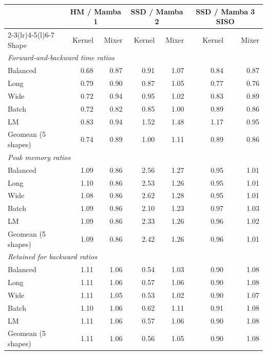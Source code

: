 \begin{tabular}{@{}lrrrrrr@{}}
\toprule
& \multicolumn{2}{c}{HM / Mamba 1} & \multicolumn{2}{c}{SSD / Mamba 2} & \multicolumn{2}{c}{SSD / Mamba 3 SISO} \\
\cmidrule(lr){2-3}\cmidrule(lr){4-5}\cmidrule(l){6-7}
Shape & Kernel & Mixer & Kernel & Mixer & Kernel & Mixer \\
\midrule
\multicolumn{7}{l}{\emph{Forward-and-backward time ratios}} \\
\addlinespace[2pt]
Balanced & 0.68 & 0.87 & 0.91 & 1.07 & 0.84 & 0.87 \\
Long & 0.79 & 0.90 & 0.87 & 1.05 & 0.77 & 0.76 \\
Wide & 0.72 & 0.94 & 0.95 & 1.02 & 0.83 & 0.89 \\
Batch & 0.72 & 0.82 & 0.85 & 1.00 & 0.89 & 0.86 \\
LM & 0.83 & 0.94 & 1.52 & 1.48 & 1.17 & 0.95 \\
\addlinespace[2pt]
Geomean (5 shapes) & 0.74 & 0.89 & 1.00 & 1.11 & 0.89 & 0.86 \\
\midrule
\multicolumn{7}{l}{\emph{Peak memory ratios}} \\
\addlinespace[2pt]
Balanced & 1.09 & 0.86 & 2.56 & 1.27 & 0.95 & 1.01 \\
Long & 1.10 & 0.86 & 2.53 & 1.26 & 0.95 & 1.01 \\
Wide & 1.08 & 0.86 & 2.62 & 1.28 & 0.95 & 1.01 \\
Batch & 1.09 & 0.86 & 2.10 & 1.23 & 0.97 & 1.03 \\
LM & 1.09 & 0.86 & 2.33 & 1.26 & 0.96 & 1.02 \\
\addlinespace[2pt]
Geomean (5 shapes) & 1.09 & 0.86 & 2.42 & 1.26 & 0.96 & 1.01 \\
\midrule
\multicolumn{7}{l}{\emph{Retained for backward ratios}} \\
\addlinespace[2pt]
Balanced & 1.11 & 1.06 & 0.54 & 1.03 & 0.90 & 1.08 \\
Long & 1.11 & 1.06 & 0.57 & 1.06 & 0.90 & 1.08 \\
Wide & 1.11 & 1.05 & 0.53 & 1.02 & 0.90 & 1.07 \\
Batch & 1.10 & 1.06 & 0.62 & 1.11 & 0.91 & 1.08 \\
LM & 1.11 & 1.06 & 0.57 & 1.06 & 0.90 & 1.08 \\
\addlinespace[2pt]
Geomean (5 shapes) & 1.11 & 1.06 & 0.56 & 1.05 & 0.90 & 1.08 \\
\bottomrule
\end{tabular}

